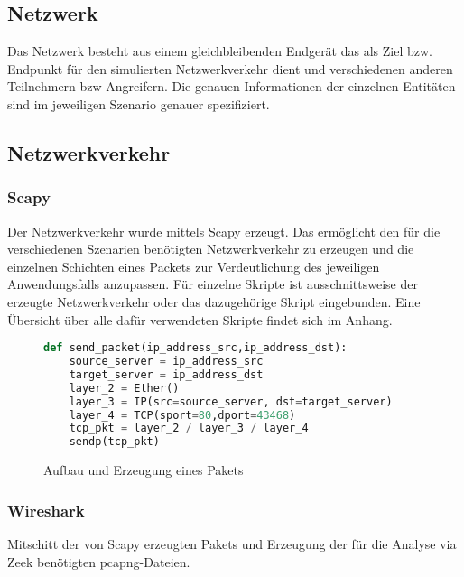 \subsection{Netzwerk}
Das Netzwerk besteht aus einem gleichbleibenden Endgerät das als Ziel bzw. Endpunkt für den simulierten Netzwerkverkehr dient und verschiedenen anderen Teilnehmern bzw Angreifern. Die genauen Informationen der einzelnen Entitäten sind im jeweiligen Szenario genauer spezifiziert.
\subsection{Netzwerkverkehr}
\subsubsection{Scapy}
Der Netzwerkverkehr wurde mittels Scapy erzeugt. Das ermöglicht den für die verschiedenen Szenarien benötigten Netzwerkverkehr zu erzeugen und die einzelnen Schichten eines Packets zur Verdeutlichung des jeweiligen Anwendungsfalls anzupassen. Für einzelne Skripte ist ausschnittsweise der erzeugte Netzwerkverkehr oder das dazugehörige Skript eingebunden. Eine Übersicht über alle dafür verwendeten Skripte findet sich im Anhang.
\begin{figure}[h!]
\centering
\begin{lstlisting}[language=python]
def send_packet(ip_address_src,ip_address_dst):
    source_server = ip_address_src
    target_server = ip_address_dst
    layer_2 = Ether()
    layer_3 = IP(src=source_server, dst=target_server)
    layer_4 = TCP(sport=80,dport=43468)
    tcp_pkt = layer_2 / layer_3 / layer_4
    sendp(tcp_pkt)
\end{lstlisting}
\caption{Aufbau und Erzeugung eines Pakets}
\end{figure}
\subsubsection{Wireshark}
Mitschitt der von Scapy erzeugten Pakets und Erzeugung der für die Analyse via Zeek benötigten pcapng-Dateien.
